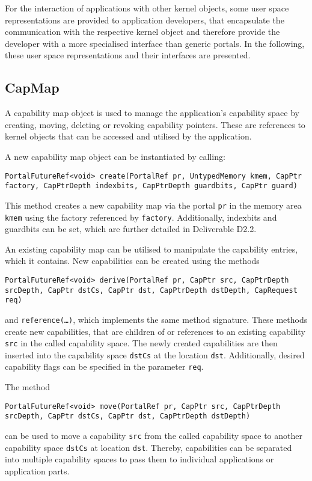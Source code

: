 For the interaction of applications with other kernel objects, some user space
representations are provided to application developers, that encapsulate the
communication with the respective kernel object and therefore provide the
developer with a more specialised interface than generic portals. In the
following, these user space representations and their interfaces are presented.

\subsection{CapMap}

A capability map object is used to manage the application's capability space by
creating, moving, deleting or revoking capability pointers. These are references
to kernel objects that can be accessed and utilised by the application.

A new capability map object can be instantiated by calling:
\lstset{language=c++,numbers=none}
\begin{lstlisting}
PortalFutureRef<void> create(PortalRef pr, UntypedMemory kmem, CapPtr factory, CapPtrDepth indexbits, CapPtrDepth guardbits, CapPtr guard)
\end{lstlisting}

\noindent This method creates a new capability map via the portal \texttt{pr} in the
memory area \texttt{kmem} using the factory referenced by \texttt{factory}.
Additionally, indexbits and guardbits can be set, which are further detailed in
Deliverable D2.2.

An existing capability map can be utilised to manipulate the capability entries,
which it contains. New capabilities can be created using the methods
\lstset{language=c++,numbers=none}
\begin{lstlisting}
PortalFutureRef<void> derive(PortalRef pr, CapPtr src, CapPtrDepth srcDepth, CapPtr dstCs, CapPtr dst, CapPtrDepth dstDepth, CapRequest req)
\end{lstlisting}

\noindent and \texttt{reference(\ldots)}, which implements the same method
signature.  These methods create new capabilities, that are children of or
references to an existing capability \texttt{src} in the called capability
space. The newly created capabilities are then inserted into the capability
space \texttt{dstCs} at the location \texttt{dst}. Additionally, desired
capability flags can be specified in the parameter \texttt{req}.

The method
\lstset{language=c++,numbers=none}
\begin{lstlisting}
PortalFutureRef<void> move(PortalRef pr, CapPtr src, CapPtrDepth srcDepth, CapPtr dstCs, CapPtr dst, CapPtrDepth dstDepth)
\end{lstlisting}
\noindent can be
used to move a capability \texttt{src} from the called capability space to
another capability space \texttt{dstCs} at location \texttt{dst}. Thereby,
capabilities can be separated into multiple capability spaces to pass them to
individual applications or application parts.

